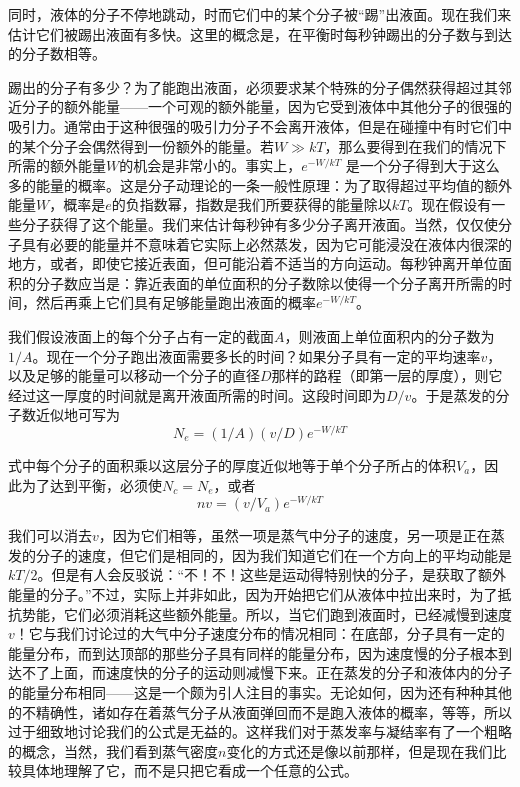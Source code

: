 同时，液体的分子不停地跳动，时而它们中的某个分子被“踢”出液面。现在我们来估计它们被踢出液面有多快。这里的概念是，在平衡时每秒钟踢出的分子数与到达的分子数相等。

踢出的分子有多少？为了能跑出液面，必须要求某个特殊的分子偶然获得超过其邻近分子的额外能量——一个可观的额外能量，因为它受到液体中其他分子的很强的吸引力。通常由于这种很强的吸引力分子不会离开液体，但是在碰撞中有时它们中的某个分子会偶然得到一份额外的能量。若$W\gg kT$，那么要得到在我们的情况下所需的额外能量$W$的机会是非常小的。事实上，$e^{-W/kT}$ 是一个分子得到大于这么多的能量的概率。这是分子动理论的一条一般性原理：为了取得超过平均值的额外能量$W$，概率是$e$的负指数幂，指数是我们所要获得的能量除以$kT$。现在假设有一些分子获得了这个能量。我们来估计每秒钟有多少分子离开液面。当然，仅仅使分子具有必要的能量并不意味着它实际上必然蒸发，因为它可能浸没在液体内很深的地方，或者，即使它接近表面，但可能沿着不适当的方向运动。每秒钟离开单位面积的分子数应当是：靠近表面的单位面积的分子数除以使得一个分子离开所需的时间，然后再乘上它们具有足够能量跑出液面的概率$e^{-W/kT}$。

我们假设液面上的每个分子占有一定的截面$A$，则液面上单位面积内的分子数为$1/A$。现在一个分子跑出液面需要多长的时间？如果分子具有一定的平均速率$v$，以及足够的能量可以移动一个分子的直径$D$那样的路程（即第一层的厚度），则它经过这一厚度的时间就是离开液面所需的时间。这段时间即为$D/v$。于是蒸发的分子数近似地可写为
\begin{equation}
    \label{Eq:I:42:3}
    N_e=(1/A)(v/D)e^{-W/kT}
\end{equation}

式中每个分子的面积乘以这层分子的厚度近似地等于单个分子所占的体积$V_a$，因此为了达到平衡，必须使$N_c=N_e$，或者
\begin{equation}
    \label{Eq:I:42:4}
    nv=(v/V_a)e^{-W/kT}
\end{equation}

我们可以消去$v$，因为它们相等，虽然一项是蒸气中分子的速度，另一项是正在蒸发的分子的速度，但它们是相同的，因为我们知道它们在一个方向上的平均动能是$kT/2$。但是有人会反驳说：“不！不！这些是运动得特别快的分子，是获取了额外能量的分子。”不过，实际上并非如此，因为开始把它们从液体中拉出来时，为了抵抗势能，它们必须消耗这些额外能量。所以，当它们跑到液面时，已经减慢到速度$v$！它与我们讨论过的大气中分子速度分布的情况相同：在底部，分子具有一定的能量分布，而到达顶部的那些分子具有同样的能量分布，因为速度慢的分子根本到达不了上面，而速度快的分子的运动则减慢下来。正在蒸发的分子和液体内的分子的能量分布相同——这是一个颇为引人注目的事实。无论如何，因为还有种种其他的不精确性，诸如存在着蒸气分子从液面弹回而不是跑入液体的概率，等等，所以过于细致地讨论我们的公式是无益的。这样我们对于蒸发率与凝结率有了一个粗略的概念，当然，我们看到蒸气密度$n$变化的方式还是像以前那样，但是现在我们比较具体地理解了它，而不是只把它看成一个任意的公式。

